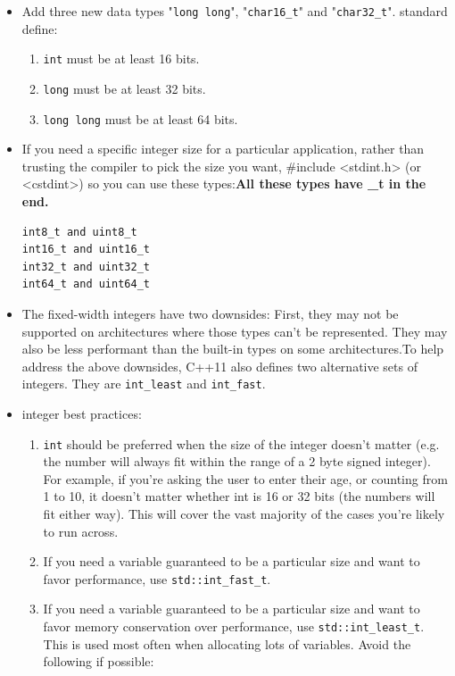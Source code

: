 \documentclass[a4paper,11pt,twoside]{book}
\begin{document}
\begin{itemize}
\item Add three new data types "\texttt{long long}", "\texttt{char16\_t}"  and "\texttt{char32\_t}". standard define:
\begin{enumerate}
\item \texttt{int} must be at least 16 bits.
\item \texttt{long} must be at least 32 bits.
\item \texttt{long long} must be at least 64 bits.
\end{enumerate}

\item If you need a specific integer size for a particular application, rather than trusting the compiler to pick the size you want, \#include <stdint.h> (or <cstdint>) so you can use these types:\textbf{All these types have \_t in the end.}
\begin{lstlisting}[numbers=none]
int8_t and uint8_t
int16_t and uint16_t
int32_t and uint32_t
int64_t and uint64_t
\end{lstlisting}

\item The fixed-width integers have two downsides: First, they may not be supported on architectures where those types can't be represented. They may also be less performant than the built-in types on some architectures.To help address the above downsides, C++11 also defines two alternative sets of integers. They are \texttt{int\_least} and \texttt{int\_fast}.  


\item integer best practices:
\begin{enumerate}
	\item \texttt{int} should be preferred when the size of the integer doesn't matter (e.g. the number will always fit within the range of a 2 byte signed integer). For example, if you're asking the user to enter their age, or counting from 1 to 10, it doesn't matter whether int is 16 or 32 bits (the numbers will fit either way). This will cover the vast majority of the cases you're likely to run across.
	
	\item If you need a variable guaranteed to be a particular size and want to favor performance, use \texttt{std::int\_fast\_t}.
	
	\item If you need a variable guaranteed to be a particular size and want to favor memory conservation over performance, use \texttt{std::int\_least\_t}. This is used most often when allocating lots of variables.
	Avoid the following if possible:
	

\end{enumerate}
\end{itemize}
\end{document}
